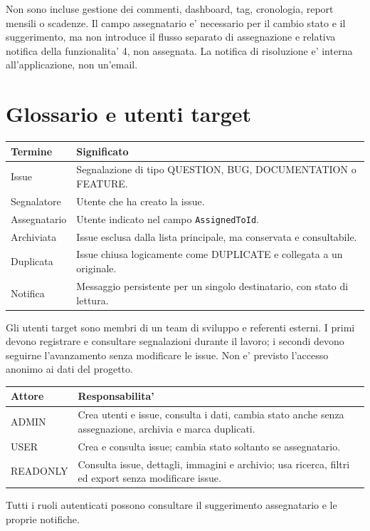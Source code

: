 \documentclass[11pt,a4paper,oneside]{report}
\begin{document}
Non sono incluse gestione dei commenti, dashboard, tag, cronologia,
report mensili o scadenze. Il campo assegnatario e' necessario per il
cambio stato e il suggerimento, ma non introduce il flusso separato di
assegnazione e relativa notifica della funzionalita' 4, non assegnata.
La notifica di risoluzione e' interna all'applicazione, non un'email.

\clearpage
\section{Glossario e utenti target}
\begin{longtable}{P{0.23\textwidth} P{0.70\textwidth}}
\toprule Termine & Significato\\\midrule\endhead
Issue & Segnalazione di tipo QUESTION, BUG, DOCUMENTATION o FEATURE.\\
Segnalatore & Utente che ha creato la issue.\\
Assegnatario & Utente indicato nel campo \texttt{AssignedToId}.\\
Archiviata & Issue esclusa dalla lista principale, ma conservata e consultabile.\\
Duplicata & Issue chiusa logicamente come DUPLICATE e collegata a un originale.\\
Notifica & Messaggio persistente per un singolo destinatario, con stato di lettura.\\
\bottomrule
\end{longtable}

Gli utenti target sono membri di un team di sviluppo e referenti esterni.
I primi devono registrare e consultare segnalazioni durante il lavoro;
i secondi devono seguirne l'avanzamento senza modificare le issue.
Non e' previsto l'accesso anonimo ai dati del progetto.

\begin{tabularx}{\textwidth}{P{0.22\textwidth} X}
\toprule Attore & Responsabilita'\\\midrule
ADMIN & Crea utenti e issue, consulta i dati, cambia stato anche senza assegnazione, archivia e marca duplicati.\\
USER & Crea e consulta issue; cambia stato soltanto se assegnatario.\\
READONLY & Consulta issue, dettagli, immagini e archivio; usa ricerca, filtri ed export senza modificare issue.\\
\bottomrule
\end{tabularx}

Tutti i ruoli autenticati possono consultare il suggerimento assegnatario
e le proprie notifiche.
\end{document}
